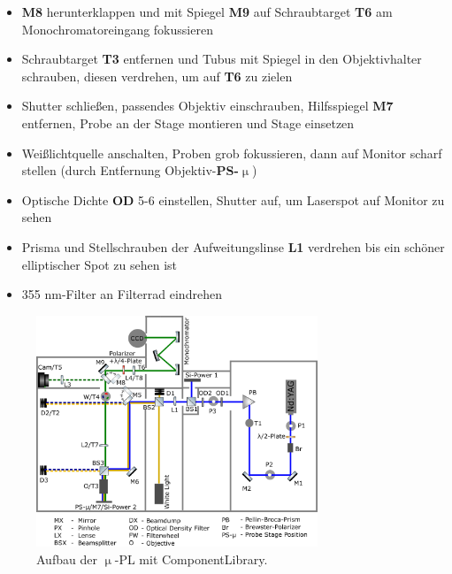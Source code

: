 \begin{itemize}
\item \textbf{M8} herunterklappen und mit Spiegel \textbf{M9} auf Schraubtarget \textbf{T6} am Monochromatoreingang fokussieren
\item Schraubtarget \textbf{T3} entfernen und Tubus mit Spiegel in den Objektivhalter schrauben, diesen verdrehen, um auf \textbf{T6} zu zielen
\item Shutter schließen, passendes Objektiv einschrauben, Hilfsspiegel \textbf{M7} entfernen, Probe an der Stage montieren und Stage einsetzen
\item Weißlichtquelle anschalten, Proben grob fokussieren, dann auf Monitor scharf stellen (durch Entfernung Objektiv-\textbf{PS-$\upmu$})
\item Optische Dichte \textbf{OD} 5-6 einstellen, Shutter auf, um Laserspot auf Monitor zu sehen
\item Prisma und Stellschrauben der Aufweitungslinse \textbf{L1} verdrehen bis ein schöner elliptischer Spot zu sehen ist
\item 355 nm-Filter an Filterrad eindrehen
\end{itemize}
\begin{figure}[h]
\centering
\includegraphics[width=0.75\textwidth]{Bilder/Anhang/justage}
\caption[Justage $\upmu$-PL]{Aufbau der $\upmu$-PL mit ComponentLibrary\cite{lib}.}
\end{figure}
\label{JustImg}
\newpage
